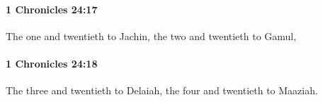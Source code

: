 		\paragraph{1 Chronicles 24:17} %
			\label{1CHRONICLES-24-17}

			The one and twentieth to Jachin, the two and twentieth to Gamul,


		\paragraph{1 Chronicles 24:18} %
			\label{1CHRONICLES-24-18}

			The three and twentieth to Delaiah, the four and twentieth to Maaziah.


